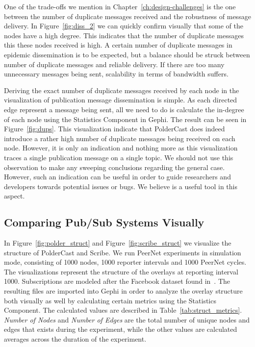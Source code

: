 One of the trade-offs we mention in Chapter~\ref{ch:design-challenges}
is the one between the number of duplicate messages received and the
robustness of message delivery. In Figure~\ref{fig:diss_2} we can
quickly confirm visually that some of the nodes have a high degree. This
indicates that the number of duplicate messages this these nodes
received is high. A certain number of duplicate messages in epidemic
dissemination is to be expected, but a balance should be struck between
number of duplicate messages and reliable delivery. If there are too
many unnecessary messages being sent, scalability in terms of bandwidth
suffers.

Deriving the exact number of duplicate messages received by each node in
the visualization of publication message dissemination is
simple. As each directed edge represent a message being sent, all we
need to do is calculate the in-degree of each node using the Statistics
Component in Gephi. The result can be seen in Figure~\ref{fig:dups}.
This visualization indicate that PolderCast does indeed introduce a
rather high number of duplicate messages being received on each node.
However, it is only an indication and nothing more as this visualization
traces a single publication message on a single topic. We should not use
this observation to make any sweeping conclusions regarding the general
case. However, such an indication can be useful in order to guide
researchers and developers towards potential issues or bugs. We believe
\demo is a useful tool in this aspect.

\subsection{Comparing Pub/Sub Systems Visually}
\label{sec:comparing}

In Figure~\ref{fig:polder_struct} and Figure~\ref{fig:scribe_struct} we
visualize the structure of PolderCast and Scribe. We run PeerNet
experiments in simulation mode, consisting of 1000 nodes, 1000 reporter
intervals and 1000 PeerNet cycles. The visualizations represent the
structure of the overlays at reporting interval 1000. Subscriptions are
modeled after the Facebook dataset found in~\cite{facebook-eurosys09}.
The resulting \gexf{} files are imported into Gephi in order to analyze
the overlay structure both visually as well by calculating certain
metrics using the Statistics Component. The calculated values are
described in Table~\ref{tab:struct_metrics}. \emph{Number of Nodes} and
\emph{Number of Edges} are the total number of unique nodes and edges
that exists during the experiment, while the other values
are calculated averages across the duration of the experiment.

